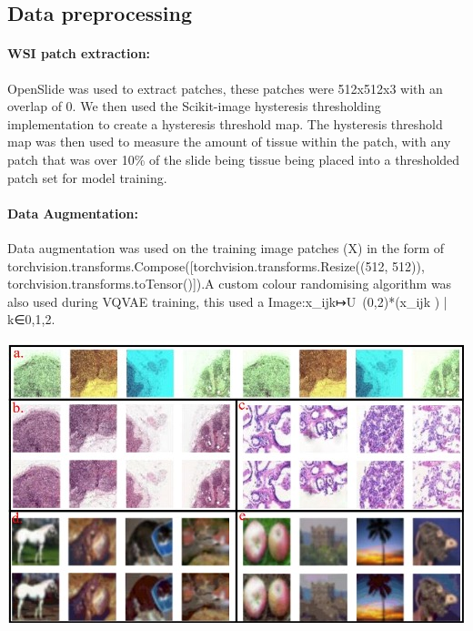 \documentclass[review]{elsarticle}
\begin{document}
\subsection{Data preprocessing}
\paragraph{WSI patch extraction:} OpenSlide was used to extract patches, these patches were 512x512x3 with an overlap of 0. We then used the Scikit-image hysteresis thresholding implementation to create a hysteresis threshold map. The hysteresis threshold map was then used to measure the amount of tissue within the patch, with any patch that was over 10\% of the slide being tissue being placed into a thresholded patch set for model training.

\paragraph{Data Augmentation:} Data augmentation was used on the training image patches (X) in the form of torchvision.transforms.Compose([torchvision.transforms.Resize((512, 512)), torchvision.transforms.toTensor()]).A custom colour randomising algorithm was also used during VQVAE training, this used a Image:x_ijk↦U~(0,2)*(x_ijk )  | k∈{0,1,2}.

\begin{center}
\includegraphics[width=1\linewidth]{Figures/Example VQVAE images reconstructions and data augmentation.jpeg}
\end{center}

\end{document}

